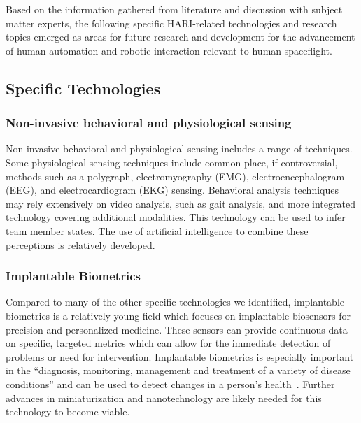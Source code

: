 Based on the information gathered from literature and discussion with subject matter experts, the following specific HARI-related technologies and research topics emerged as areas for future research and development for the advancement of human automation and robotic interaction relevant to human spaceflight.

\subsection{Specific Technologies}
\subsubsection{Non-invasive behavioral and physiological sensing}
Non-invasive behavioral and physiological sensing includes a range of techniques.
Some physiological sensing techniques include common place, if controversial, methods such as a polygraph, electromyography (EMG), electroencephalogram (EEG), and electrocardiogram (EKG) sensing.
Behavioral analysis techniques may rely extensively on video analysis, such as gait analysis, and more integrated technology covering additional modalities.
This technology can be used to infer team member states.
The use of artificial intelligence to combine these perceptions is relatively developed.

\subsubsection{Implantable Biometrics}
Compared to many of the other specific technologies we identified, implantable biometrics is a relatively young field which focuses on implantable biosensors for precision and personalized medicine.
These sensors can provide continuous data on specific, targeted metrics which can allow for the immediate detection of problems or need for intervention.
Implantable biometrics is especially important in the ``diagnosis, monitoring, management and treatment of a variety of disease conditions'' and can be used to detect changes in a person's health~\citep{fitts_human_1951}.
Further advances in miniaturization and nanotechnology are likely needed for this technology to become viable.

